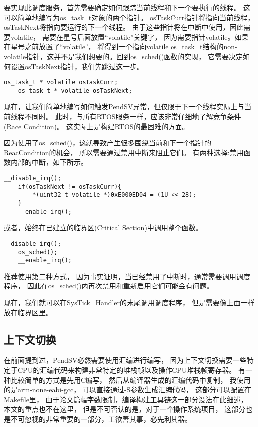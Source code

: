 要实现此调度服务，首先需要确定如何跟踪当前线程和下一个要执行的线程。
这可以简单地编写为os\_task\_t对象的两个指针。
osTaskCurr指针将指向当前线程，osTaskNext将指向要运行的下一个线程。
由于这些指针将在中断中使用，因此需要volatile，
需要在星号后面放置“volatile”关键字，
因为需要指针volatile。如果在星号之前放置了“volatile”，
将得到一个指向volatile os\_task\_t结构的non-volatile指针，这并不是我们想要的。回到os\_sched()函数的实现，
它需要决定如何设置osTaskNext指针，我们先跳过这一步。
\begin{lstlisting}[language={[ANSI]C},keywordstyle=\color{blue!70},commentstyle=\color{red!50!green!50!blue!50},frame=shadowbox, rulesepcolor=\color{red!20!green!20!blue!20}]
    os_task_t * volatile osTaskCurr;
    os_task_t * volatile osTaskNext;
\end{lstlisting}
现在，让我们简单地编写如何触发PendSV异常，但仅限于下一个线程实际上与当前线程不同时。
此时，与所有RTOS服务一样，应该非常仔细地了解竞争条件(Race Condition)。
这实际上是构建RTOS的最困难的方面。

因为使用了os\_sched()，这就导致产生很多围绕当前和下一个指针的ReacCondition的机会，
所以需要通过禁用中断来阻止它们。
有两种选择:禁用函数内部的中断，如下所示。
\begin{lstlisting}[language={[ANSI]C},keywordstyle=\color{blue!70},commentstyle=\color{red!50!green!50!blue!50},frame=shadowbox, rulesepcolor=\color{red!20!green!20!blue!20}]
    __disable_irq();
    if(osTaskNext != osTaskCurr){
        *(uint32_t volatile *)0xE000ED04 = (1U << 28);
    }
    __enable_irq();
\end{lstlisting}
或者，始终在已建立的临界区(Critical Section)中调用整个函数。
\begin{lstlisting}[language={[ANSI]C},keywordstyle=\color{blue!70},commentstyle=\color{red!50!green!50!blue!50},frame=shadowbox, rulesepcolor=\color{red!20!green!20!blue!20}]
    __disable_irq();
    os_sched();
    __enable_irq();
\end{lstlisting}
推荐使用第二种方式，
因为事实证明，当已经禁用了中断时，通常需要调用调度程序，
因此在os\_sched()内再次禁用和重新启用它们可能会有问题。

现在，我们就可以在SysTick\_Handler的末尾调用调度程序，
但是需要像上面一样放在临界区里。

\subsection{上下文切换}

在前面提到过，PendSV必然需要使用汇编进行编写，
因为上下文切换需要一些特定于CPU的汇编代码来构建非常特定的堆栈帧以及操作CPU堆栈帧寄存器。
有一种比较简单的方式是先用C编写，
然后从编译器生成的汇编代码中复制，
我使用的是arm-none-eabi-gcc，
可以直接通过-S参数生成汇编代码，
这部分可以配置在Makefile里，
由于论文篇幅字数限制，编译构建工具链这一部分没法在此细述，
本文的重点也不在这里，
但是不可否认的是，对于一个操作系统项目，
这部分也是不可忽视的非常重要的一部分，工欲善其事，必先利其器。

